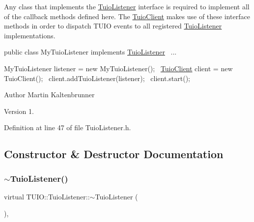 Any class that implements the \hyperlink{class_t_u_i_o_1_1_tuio_listener}{Tuio\+Listener} interface is required to implement all of the callback methods defined here. The \hyperlink{class_t_u_i_o_1_1_tuio_client}{Tuio\+Client} makes use of these interface methods in order to dispatch T\+U\+IO events to all registered \hyperlink{class_t_u_i_o_1_1_tuio_listener}{Tuio\+Listener} implementations.

{\ttfamily  public class My\+Tuio\+Listener implements \hyperlink{class_t_u_i_o_1_1_tuio_listener}{Tuio\+Listener}~\newline
 ...}

{\ttfamily  My\+Tuio\+Listener listener = new My\+Tuio\+Listener();~\newline
 \hyperlink{class_t_u_i_o_1_1_tuio_client}{Tuio\+Client} client = new Tuio\+Client();~\newline
 client.\+add\+Tuio\+Listener(listener);~\newline
 client.\+start();~\newline
 }

\begin{DoxyAuthor}{Author}
Martin Kaltenbrunner 
\end{DoxyAuthor}
\begin{DoxyVersion}{Version}
1. 
\end{DoxyVersion}


Definition at line 47 of file Tuio\+Listener.\+h.



\subsection{Constructor \& Destructor Documentation}
\mbox{\label{class_t_u_i_o_1_1_tuio_listener_ad26ffa48dd45e148e6582724da49b283}} 
\subsubsection{\texorpdfstring{$\sim$\+Tuio\+Listener()}{~TuioListener()}}
{\footnotesize\ttfamily virtual T\+U\+I\+O\+::\+Tuio\+Listener\+::$\sim$\+Tuio\+Listener (\begin{DoxyParamCaption}{ }\end{DoxyParamCaption})\hspace{0.3cm}{\ttfamily [inline]}, {\ttfamily [virtual]}}


